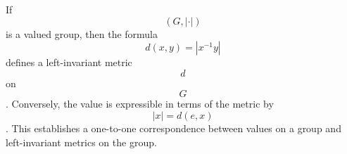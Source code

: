 If $$(G, |\cdot|)$$ is a valued group, then the formula $$d(x, y) = |x^{-1}y|$$ defines a left-invariant metric $$d$$ on $$G$$. Conversely, the value is expressible in terms of the metric by $$|x| = d(e, x)$$. This establishes a one-to-one correspondence between values on a group and left-invariant metrics on the group.
